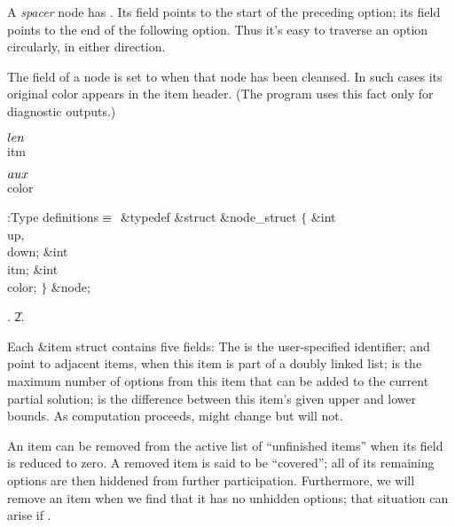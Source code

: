 A {\it spacer\/} node has . Its  field points
to the start
of the preceding option; its  field points to the end of the
following option.
Thus it's easy to traverse an option circularly, in either direction.

The  field of a node is set to  when that node has
been cleansed.
In such cases its original color appears in the item header.
(The program uses this fact only for diagnostic outputs.)

\Y\B\4\D$\\{len}$ \5
\\{itm}\par
\B\4\D$\\{aux}$ \5
\\{color}\par
\Y\B\4:Type definitions\X${}\equiv{}$\6
\&{typedef} \&{struct} \&{node\_struct} ${}\{{}$\1\6
\&{int} \\{up}${},{}$ \\{down};\6
\&{int} \\{itm};\6
\&{int} \\{color};\2\6
${}\}{}$ \&{node};\par
{}.
\U2.\fi

Each \&{item} struct contains five fields:
The  is the user-specified identifier;
 and  point to adjacent items, when this
item is part of a doubly linked list;
 is the maximum number of options from this item that can
be added to the current partial solution;
 is the difference between this item's given upper and lower
bounds.
As computation proceeds,  might change but  will
not.

An item can be removed from the active list of ``unfinished items'' when its
 field is reduced to zero. A removed item is said to be
``covered'';
all of its remaining options are then hiddened from further participation.
Furthermore, we will remove an item when we find that it has no unhidden
options; that situation can arise if .

